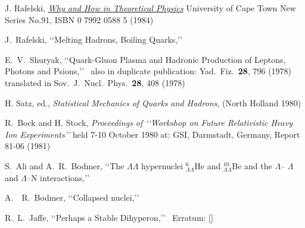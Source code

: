 \begin{thebibliography}{100}
J. Rafelski, \href{http://inspirehep.net/record/1750535/files/Rafelski.pdf}{\textit{Why and How in Theoretical Physics}} University of Cape Town New Series No.91, ISBN 0 7992 0588 5 (1984) 
 
 
 J.~Rafelski,
 \lq\lq Melting Hadrons, Boiling Quarks,\rq\rq\ 

 
  E.~V.~Shuryak,
\lq\lq Quark-Gluon Plasma and Hadronic Production of Leptons, Photons and Psions,\rq\rq\
  also in 
 duplicate publication: Yad.\ Fiz.\  {\bf 28}, 796 (1978) translated in Sov.\ J.\ Nucl.\ Phys.\  {\bf 28}, 408 (1978) 


H. Satz, ed., {\it Statistical Mechanics of Quarks and Hadrons}, (North Holland 1980)

\bibitem{Bock:1980GSI}
R.~Bock and H. Stock, \textit{Proceedings of \lq\lq Workshop on Future Relativistic Heavy Ion Experiments\rq\rq} held 7-10 October 1980 at: GSI, Darmstadt, Germany, Report 81-06 (1981)


  S.~Ali and A.~R.~Bodmer,
  \lq\lq The $\Lambda\Lambda$ hypernuclei $_{\Lambda\Lambda}^6 $He and $_{\Lambda\Lambda}^{10} $Be and the $\Lambda$-- $\Lambda$ and $\Lambda$--N interactions,\rq\rq
  
  A.~~R.~Bodmer,
  \lq\lq  Collapsed nuclei,\rq\rq\
  
  
  R.~L.~Jaffe,
\lq\lq Perhaps a Stable Dihyperon,\rq\rq\
Erratum: []
  

\end{thebibliography}
